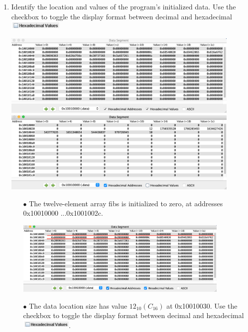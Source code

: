 \documentclass[12pt]{article}
\begin{document}
\begin{enumerate}
   \newpage
    \item Identify the location and values of the program’s initialized data. Use the checkbox to toggle the display format between decimal and hexadecimal \includegraphics[width=0.2\textwidth]{7.png}
    \begin{center}
        \includegraphics[width=0.9\textwidth]{8.png} 
        \includegraphics[width=0.9\textwidth]{9.png}
    \end{center}
    \begin{itemize}
        \item[$\bullet$] The twelve-element array fibs is initialized to zero, at addresses 0x10010000 ...0x1001002c.
        \begin{center}
            \includegraphics[width=0.85\textwidth]{10.png}
        \end{center}
        \item[$\bullet$] The data location size has value $12_{10} (C_{16})$ at 0x10010030.  Use the checkbox to toggle the display format between decimal and hexadecimal \includegraphics[width=0.2\textwidth]{7.png}.

\end{itemize}
\end{enumerate}
\end{document}
